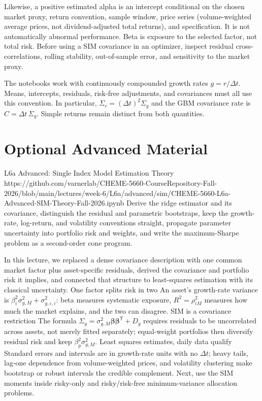 \documentclass[11pt]{article}
\begin{document}
Likewise, a positive estimated alpha is an intercept conditional on the chosen market proxy, return convention, sample window, price series (volume-weighted average prices, not dividend-adjusted total returns), and specification. It is not automatically abnormal performance. Beta is exposure to the selected factor, not total risk. Before using a SIM covariance in an optimizer, inspect residual cross-correlations, rolling stability, out-of-sample error, and sensitivity to the market proxy.

The notebooks work with continuously compounded growth rates $g=r/\Delta t$. Means, intercepts, residuals, risk-free adjustments, and covariances must all use this convention. In particular, $\Sigma_r=(\Delta t)^2\Sigma_g$ and the GBM covariance rate is $C=\Delta t\,\Sigma_g$. Simple returns remain distinct from both quantities.

\newpage
\section*{Optional Advanced Material}

\notebooklink
  {L6a Advanced: Single Index Model Estimation Theory}
  {https://github.com/varnerlab/CHEME-5660-CourseRepository-Fall-2026/blob/main/lectures/week-6/L6a/advanced/sim/CHEME-5660-L6a-Advanced-SIM-Theory-Fall-2026.ipynb}
  {Derive the ridge estimator and its covariance, distinguish the residual and parametric bootstraps, keep the growth-rate, log-return, and volatility conventions straight, propagate parameter uncertainty into portfolio risk and weights, and write the maximum-Sharpe problem as a second-order cone program.}

\newpage
\thispagestyle{fancy}
\keytakeaways
  {In this lecture, we replaced a dense covariance description with one common market factor plus asset-specific residuals, derived the covariance and portfolio risk it implies, and connected that structure to least-squares estimation with its classical uncertainty.}
  {One factor splits risk in two}
  {An asset's growth-rate variance is $\beta_i^2\sigma_{g,M}^2+\sigma_{g,\varepsilon,i}^2$: beta measures systematic exposure, $R^2=\rho_{iM}^2$ measures how much the market explains, and the two can disagree.}
  {SIM is a covariance restriction}
  {The formula $\Sigma_g=\sigma_{g,M}^2\boldsymbol\beta\boldsymbol\beta^{\mathsf T}+D_g$ requires residuals to be uncorrelated across assets, not merely fitted separately; equal-weight portfolios then diversify residual risk and keep $\beta_p^2\sigma_{g,M}^2$.}
  {Least squares estimates, daily data qualify}
  {Standard errors and intervals are in growth-rate units with no $\Delta t$; heavy tails, lag-one dependence from volume-weighted prices, and volatility clustering make bootstrap or robust intervals the credible complement.}
  {Next, use the SIM moments inside risky-only and risky/risk-free minimum-variance allocation problems.}
\end{document}
